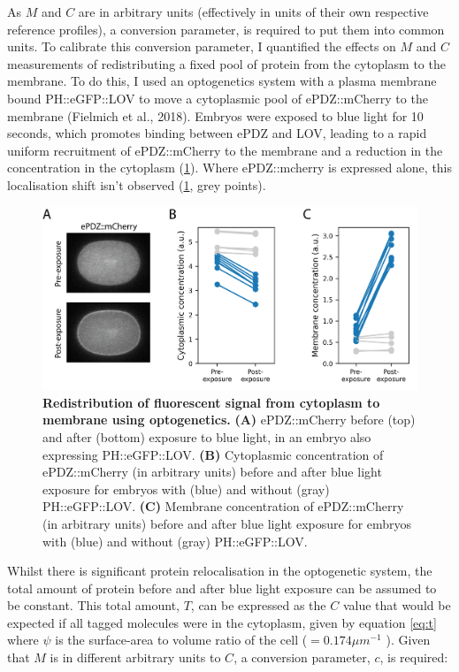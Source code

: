 \documentclass[12pt]{"article"}
\newcommand{\mycaption}[2]{\caption[#1]{\textbf{#1.} #2}}
\begin{document}
As $M$ and $C$ are in arbitrary units (effectively in units of their own respective reference profiles), a conversion parameter, is required to put them into common units. To calibrate this conversion parameter, I quantified the effects on $M$ and $C$ measurements of redistributing a fixed pool of protein from the cytoplasm to the membrane. To do this, I used an optogenetics system with a plasma membrane bound PH::eGFP::LOV to move a cytoplasmic pool of ePDZ::mCherry to the membrane (Fielmich et al., 2018). Embryos were exposed to blue light for 10 seconds, which promotes binding between ePDZ and LOV, leading to a rapid uniform recruitment of ePDZ::mCherry to the membrane and a reduction in the concentration in the cytoplasm (\cref{fig:memquant_optogenetics}). Where ePDZ::mcherry is expressed alone, this localisation shift isn't observed (\cref{fig:memquant_optogenetics}, grey points).\\

\begin{figure}
\includegraphics[scale=1]{memquant_optogenetics}
\centering
\mycaption{Redistribution of fluorescent signal from cytoplasm to membrane using optogenetics}{
\textbf{(A)} ePDZ::mCherry before (top) and after (bottom) exposure to blue light, in an embryo also expressing PH::eGFP::LOV.
\textbf{(B)} Cytoplasmic concentration of ePDZ::mCherry (in arbitrary units) before and after blue light exposure for embryos with (blue) and without (gray) PH::eGFP::LOV. 
\textbf{(C)} Membrane concentration of ePDZ::mCherry (in arbitrary units) before and after blue light exposure for embryos with (blue) and without (gray) PH::eGFP::LOV. 
}
\label{fig:memquant_optogenetics}
\end{figure}

Whilst there is significant protein relocalisation in the optogenetic system, the total amount of protein before and after blue light exposure can be assumed to be constant. This total amount, $T$, can be expressed as the $C$ value that would be expected if all tagged molecules were in the cytoplasm, given by equation \ref{eq:t} where $\psi$ is the surface-area to volume ratio of the cell ($= 0.174 \mu m ^ {-1}$ \citep{Goehring2011a}). Given that $M$ is in different arbitrary units to $C$, a conversion parameter, $c$, is required:
\end{document}
